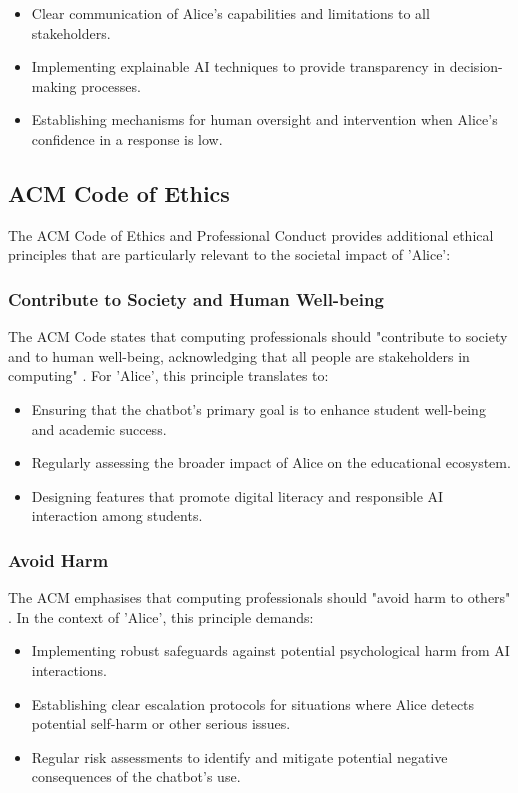 \documentclass[15pt,a4paper]{article}
\begin{document}
\begin{multicols}{2}
\begin{itemize}
    \item Clear communication of Alice's capabilities and limitations to all stakeholders.
    \item Implementing explainable AI techniques to provide transparency in decision-making processes.
    \item Establishing mechanisms for human oversight and intervention when Alice's confidence in a response is low.
\end{itemize}

\subsection{ACM Code of Ethics}

The ACM Code of Ethics and Professional Conduct \textit{\parencite[p. 1]{ACM2023}} provides additional ethical principles that are particularly relevant to the societal impact of 'Alice':

\subsubsection*{Contribute to Society and Human Well-being}
The ACM Code states that computing professionals should "contribute to society and to human well-being, acknowledging that all people are stakeholders in computing" \textit{\parencite[p. 1]{ACM2023}}. For 'Alice', this principle translates to:

\begin{itemize}
    \item Ensuring that the chatbot's primary goal is to enhance student well-being and academic success.
    \item Regularly assessing the broader impact of Alice on the educational ecosystem.
    \item Designing features that promote digital literacy and responsible AI interaction among students.
\end{itemize}

\subsubsection*{Avoid Harm}
The ACM emphasises that computing professionals should "avoid harm to others" \textit{\parencite[p. 1]{ACM2023}}. In the context of 'Alice', this principle demands:

\begin{itemize}
    \item Implementing robust safeguards against potential psychological harm from AI interactions.
    \item Establishing clear escalation protocols for situations where Alice detects potential self-harm or other serious issues.
    \item Regular risk assessments to identify and mitigate potential negative consequences of the chatbot's use.
\end{itemize}


\end{multicols}
\end{document}
